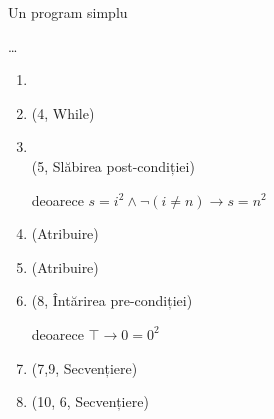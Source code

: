 % 
% 

\begin{frame}{Un program simplu}
\begin{example}[cont.]

\ldots
\begin{enumerate}[<+->]
{\setcounter{enumi}{3}}
	\item {}
	\item {} \hfill(4, While)
	\item {}\\ \hfill(5, Slăbirea post-condiției)

	deoarece $s=i^2 \wedge \neg (i \neq n) \to s = n^2$
	\item {} \hfill (Atribuire)
	\item {} \hfill (Atribuire)
	\item {} \hfill (8, Întărirea pre-condiției)

	deoarece $\top \to 0 = 0^ 2$
	\item {} \hfill(7,9, Secvențiere)
	\item {} \hfill(10, 6, Secvențiere)
\end{enumerate} 
\end{example}
\end{frame}

